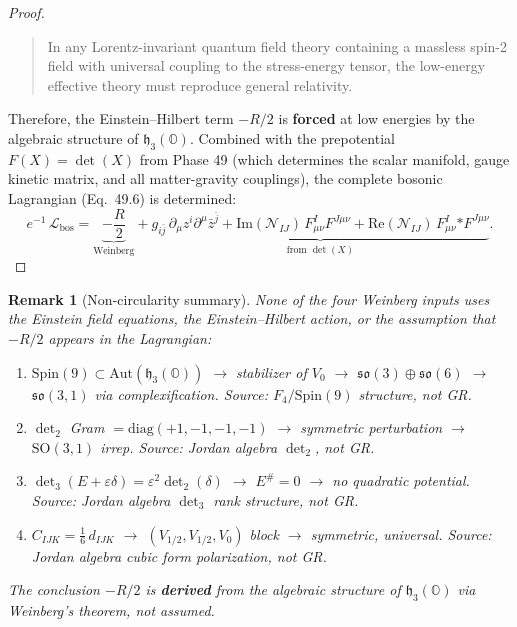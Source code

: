 \documentclass[11pt]{article}
\newtheorem{remark}{Remark}
\newcommand{\h}{\mathfrak{h}}
\begin{document}
\begin{proof}
\begin{quote}
In any Lorentz-invariant quantum field theory containing a massless
spin-2 field with universal coupling to the stress-energy tensor,
the low-energy effective theory must reproduce general relativity.
\end{quote}

Therefore, the Einstein--Hilbert term $-R/2$ is \textbf{forced}
at low energies by the algebraic structure of $\h_3(\mathbb{O})$.
Combined with the prepotential $F(X) = \det(X)$ from Phase 49
(which determines the scalar manifold, gauge kinetic matrix, and
all matter-gravity couplings), the complete bosonic Lagrangian
(Eq.~49.6) is determined:
\begin{equation}\label{eq:50.9}
  e^{-1}\,\mathcal{L}_{\mathrm{bos}}
    = \underbrace{-\frac{R}{2}}_{\text{Weinberg}}
    + \underbrace{g_{i\bar{j}}\,\partial_\mu z^i \partial^\mu \bar{z}^{\bar{j}}
    + \mathrm{Im}(\mathcal{N}_{IJ})\, F^I_{\mu\nu} F^{J\mu\nu}
    + \mathrm{Re}(\mathcal{N}_{IJ})\, F^I_{\mu\nu} {*F}^{J\mu\nu}}_{\text{from }\det(X)}.
\end{equation}
\end{proof}

\begin{remark}[Non-circularity summary]\label{rem:noncircular}
None of the four Weinberg inputs uses the Einstein field equations,
the Einstein--Hilbert action, or the assumption that $-R/2$ appears
in the Lagrangian:
\begin{enumerate}
\item[H1:] $\mathrm{Spin}(9) \subset \mathrm{Aut}(\h_3(\mathbb{O}))$
  $\to$ stabilizer of $V_0$ $\to$ $\mathfrak{so}(3) \oplus \mathfrak{so}(6)$
  $\to$ $\mathfrak{so}(3,1)$ via complexification.
  \emph{Source: $F_4/\mathrm{Spin}(9)$ structure, not GR.}
\item[H2:] $\det_2$ Gram $= \mathrm{diag}(+1,-1,-1,-1)$ $\to$
  symmetric perturbation $\to$ $\mathrm{SO}(3,1)$ irrep.
  \emph{Source: Jordan algebra $\det_2$, not GR.}
\item[H3:] $\det_3(E + \varepsilon\delta) = \varepsilon^2\det_2(\delta)$
  $\to$ $E^\# = 0$ $\to$ no quadratic potential.
  \emph{Source: Jordan algebra $\det_3$ rank structure, not GR.}
\item[H4:] $C_{IJK} = \tfrac{1}{6}\,d_{IJK}$ $\to$
  $(V_{1/2},V_{1/2},V_0)$ block $\to$ symmetric, universal.
  \emph{Source: Jordan algebra cubic form polarization, not GR.}
\end{enumerate}
The conclusion $-R/2$ is \textbf{derived} from the algebraic
structure of $\h_3(\mathbb{O})$ via Weinberg's theorem, not assumed.
\end{remark}
\end{document}
